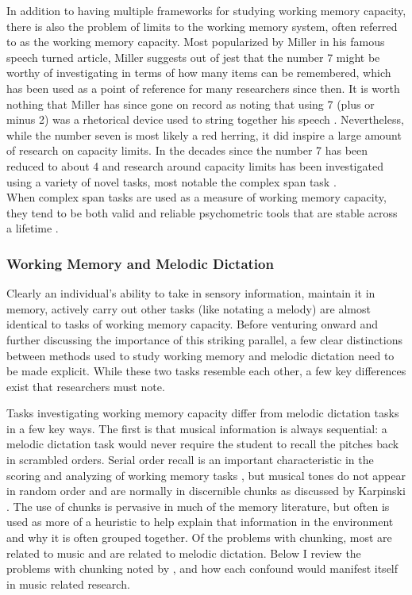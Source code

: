 \documentclass[]{book}
\begin{document}
In addition to having multiple frameworks for studying working memory capacity, there is also the problem of limits to the working memory system, often referred to as the working memory capacity.
Most popularized by Miller in his famous \citep{millerMagicalNumberSeven1956} speech turned article, Miller suggests out of jest that the number 7 might be worthy of investigating in terms of how many items can be remembered, which has been used as a point of reference for many researchers since then.
It is worth nothing that Miller has since gone on record as noting that using 7 (plus or minus 2) was a rhetorical device used to string together his speech \citep{millerHistoryPsychologyAutobiography1989}.
Nevertheless, while the number seven is most likely a red herring, it did inspire a large amount of research on capacity limits.
In the decades since the number 7 has been reduced to about 4 \citep{cowanMagicalMysteryFour2010} and research around capacity limits has been investigated using a variety of novel tasks, most notable the complex span task \citep{unsworthAutomatedVersionOperation2005, unsworthComplexWorkingMemory2009}.\\
When complex span tasks are used as a measure of working memory capacity, they tend to be both valid and reliable psychometric tools that are stable across a lifetime \citep{unsworthAutomatedVersionOperation2005}.

\hypertarget{working-memory-and-melodic-dictation}{%
\subsubsection{Working Memory and Melodic Dictation}\label{working-memory-and-melodic-dictation}}

Clearly an individual's ability to take in sensory information, maintain it in memory, actively carry out other tasks (like notating a melody) are almost identical to tasks of working memory capacity.
Before venturing onward and further discussing the importance of this striking parallel, a few clear distinctions between methods used to study working memory and melodic dictation need to be made explicit.
While these two tasks resemble each other, a few key differences exist that researchers must note.

Tasks investigating working memory capacity differ from melodic dictation tasks in a few key ways.
The first is that musical information is always sequential: a melodic dictation task would never require the student to recall the pitches back in scrambled orders.
Serial order recall is an important characteristic in the scoring and analyzing of working memory tasks \citep{conwayWorkingMemorySpan2005}, but musical tones do not appear in random order and are normally in discernible chunks as discussed by Karpinski \citep{karpinskiAuralSkillsAcquisition2000}.
The use of chunks is pervasive in much of the memory literature, but often is used as more of a heuristic to help explain that information in the environment and why it is often grouped together.
Of the problems with chunking, most are related to music and are related to melodic dictation.
Below I review the problems with chunking noted by \citet{cowanWorkingMemoryCapacity2005}, and how each confound would manifest itself in music related research.
\end{document}

